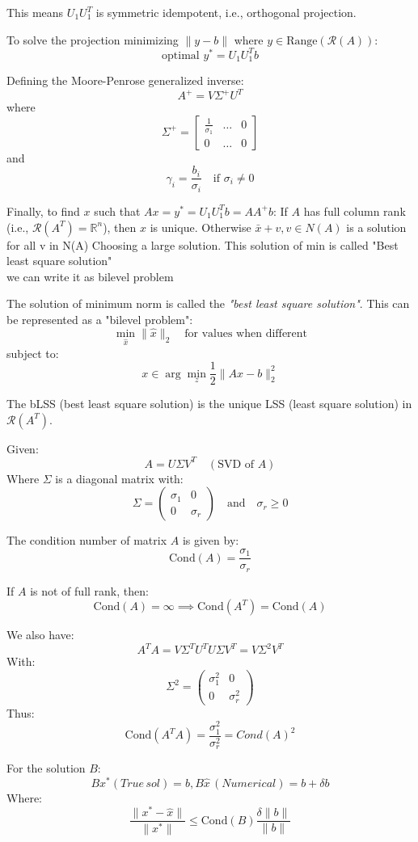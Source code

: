 \begin{problem}
  This means $U_1U_1^T$ is symmetric idempotent, i.e., orthogonal projection.
  
  To solve the projection minimizing $\| y - b \|$ where $y \in \text{Range}(\mathcal{R}(A))$:
  \[
  \text{optimal } y^* = U_1U_1^Tb
  \]
  
  Defining the Moore-Penrose generalized inverse:
  \[
  A^+ = V \Sigma^+ U^T
  \]
  where
  \[
  \Sigma^+ = \begin{bmatrix} \frac{1}{\sigma_1} & \dots & 0 \\ 0 & \dots & 0 \end{bmatrix}
  \]
  and
  \[
  \gamma_i = \frac{b_i}{\sigma_i} \quad \text{if } \sigma_i \neq 0
  \]
  
  Finally, to find $x$ such that $Ax = y^* = U_1U_1^Tb = AA^+b$:
  If $A$ has full column rank (i.e., $\mathcal{R}(A^T) = \mathbb{R}^n$), then $x$ is unique.
  Otherwise $\bar{x}+v,v\in N(A)$ is a solution for all v in N(A)
  Choosing a large solution. This solution of min is called "Best least square solution"
  \\ we can write it as bilevel problem
  
  
  
  
  The solution of minimum norm is called the \textit{"best least square solution"}. This can be represented as a "bilevel problem":
  \[
  \min_{\hat{x}} \|\hat{x}\|_2 \quad \text{for values when different}
  \]
  subject to:
  \[
  x \in \arg\min_{z} \frac{1}{2} \|Ax - b\|_2^2
  \]
  
  The bLSS (best least square solution) is the unique LSS (least square solution) in $\mathcal{R}(A^T)$.
  \end{problem}
  \begin{definition}
    
  
  Given:
  \[
  A = U \Sigma V^T \quad (\text{SVD of } A)
  \]
  Where $\Sigma$ is a diagonal matrix with:
  \[
  \Sigma = \begin{pmatrix} \sigma_1 & 0 \\ 0 & \sigma_r \end{pmatrix} \quad \text{and} \quad \sigma_r \geq 0
  \]
  
  The condition number of matrix $A$ is given by:
  \[
  \text{Cond}(A) = \frac{\sigma_1}{\sigma_r}
  \]
  
  If $A$ is not of full rank, then:
  \[
  \text{Cond}(A) = \infty \implies   \text{Cond}(A^T) = \text{Cond}(A)
  \]
  
  We also have:
  \[
  A^TA = V \Sigma^T U^T U \Sigma V^T = V \Sigma^2 V^T
  \]
  With:
  \[
  \Sigma^2 = \begin{pmatrix} \sigma_1^2 & 0 \\ 0 & \sigma_r^2 \end{pmatrix}
  \]
  Thus:
  \[
  \text{Cond}(A^TA) = \frac{\sigma_1^2}{\sigma_r^2}=Cond(A)^2
  \]
  
  For the solution $B$:
  \[
  Bx^*(True\, sol) =b, B\hat{x}\,(Numerical) = b + \delta b
  \]
  Where:
  \[
  \frac{\|x^* - \hat{x}\|}{\|x^*\|} \leq \text{Cond}(B) \frac{\delta \|b\|}{\| b\|}
  \]
  
  
  \end{definition}
  

